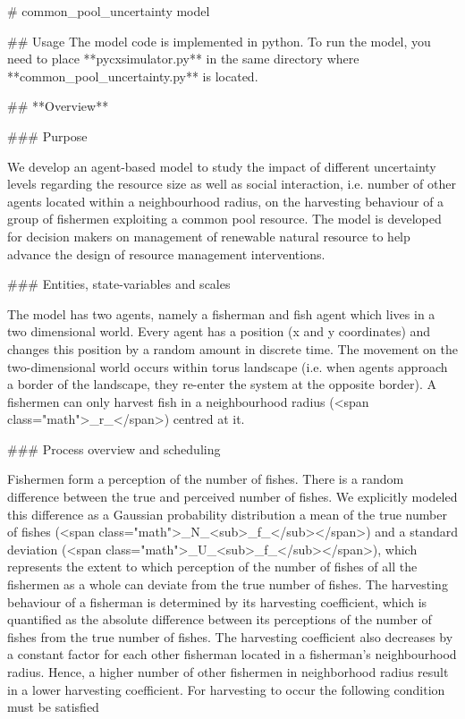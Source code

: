 # common_pool_uncertainty model

## Usage
The model code is implemented in python. To run the model, you need to place **pycxsimulator.py** in the same directory where **common_pool_uncertainty.py** is located.

## **Overview**

### Purpose

We develop an agent-based model to study the impact of different uncertainty levels regarding the resource size as well as social interaction, i.e. number of other agents located within a neighbourhood radius, on the harvesting behaviour of a group of fishermen exploiting a common pool resource. The model is developed for decision makers on management of renewable natural resource to help advance the design of resource management interventions.

### Entities, state-variables and scales

The model has two agents, namely a fisherman and fish agent which lives in a two dimensional world. Every agent has a position (x and y coordinates) and changes this position by a random amount in discrete time. The movement on the two-dimensional world occurs within torus landscape (i.e. when agents approach a border of the landscape, they re-enter the system at the opposite border). A fishermen can only harvest fish in a neighbourhood radius (<span class="math">_r_</span>) centred at it.

### Process overview and scheduling

Fishermen form a perception of the number of fishes. There is a random difference between the true and perceived number of fishes. We explicitly modeled this difference as a Gaussian probability distribution a mean of the true number of fishes (<span class="math">_N_<sub>_f_</sub></span>) and a standard deviation (<span class="math">_U_<sub>_f_</sub></span>), which represents the extent to which perception of the number of fishes of all the fishermen as a whole can deviate from the true number of fishes. The harvesting behaviour of a fisherman is determined by its harvesting coefficient, which is quantified as the absolute difference between its perceptions of the number of fishes from the true number of fishes. The harvesting coefficient also decreases by a constant factor for each other fisherman located in a fisherman’s neighbourhood radius. Hence, a higher number of other fishermen in neighborhood radius result in a lower harvesting coefficient. For harvesting to occur the following condition must be satisfied


